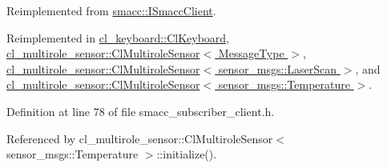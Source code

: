 Reimplemented from \hyperlink{classsmacc_1_1ISmaccClient_a974ebb6ad6cf812e7b9de6b78b3d901f}{smacc\+::\+I\+Smacc\+Client}.



Reimplemented in \hyperlink{classcl__keyboard_1_1ClKeyboard_af7f7fd9871ef5fcca400cd59d7b60775}{cl\+\_\+keyboard\+::\+Cl\+Keyboard}, \hyperlink{classcl__multirole__sensor_1_1ClMultiroleSensor_a3847e19f925f65dd034964eb2d0b3594}{cl\+\_\+multirole\+\_\+sensor\+::\+Cl\+Multirole\+Sensor$<$ Message\+Type $>$}, \hyperlink{classcl__multirole__sensor_1_1ClMultiroleSensor_a3847e19f925f65dd034964eb2d0b3594}{cl\+\_\+multirole\+\_\+sensor\+::\+Cl\+Multirole\+Sensor$<$ sensor\+\_\+msgs\+::\+Laser\+Scan $>$}, and \hyperlink{classcl__multirole__sensor_1_1ClMultiroleSensor_a3847e19f925f65dd034964eb2d0b3594}{cl\+\_\+multirole\+\_\+sensor\+::\+Cl\+Multirole\+Sensor$<$ sensor\+\_\+msgs\+::\+Temperature $>$}.



Definition at line 78 of file smacc\+\_\+subscriber\+\_\+client.\+h.



Referenced by cl\+\_\+multirole\+\_\+sensor\+::\+Cl\+Multirole\+Sensor$<$ sensor\+\_\+msgs\+::\+Temperature $>$\+::initialize().


